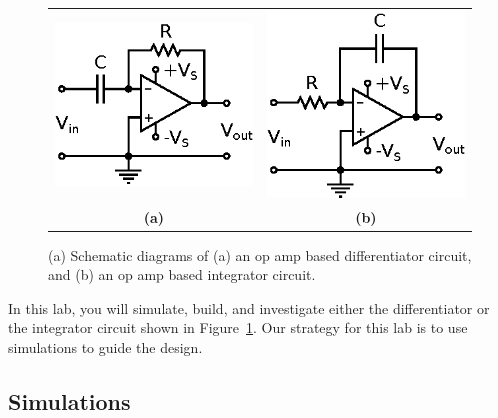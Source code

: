 \documentclass[11pt]{article}
\begin{document}
\begin{figure}[ht]
  \begin{center}
    \begin{tabular}{cc}
      \hspace{1cm}
      \includegraphics{differentiator.eps}
      \hspace{1cm}
      &
      \hspace{1cm}
      \includegraphics{integrator.eps}
      \hspace{1cm}
      \\
    \textbf{(a)} & \textbf{(b)}
    \end{tabular}
    \caption{(a) Schematic diagrams of (a) an op amp based
      differentiator circuit, and (b) an op amp based integrator
      circuit.}
    \label{fig:diffint}
  \end{center}
\end{figure}

In this lab, you will simulate, build, and investigate either the
differentiator or the integrator circuit shown in
Figure~\ref{fig:diffint}. Our strategy for this lab is to use
simulations to guide the design.

\subsection*{Simulations}
\end{document}
